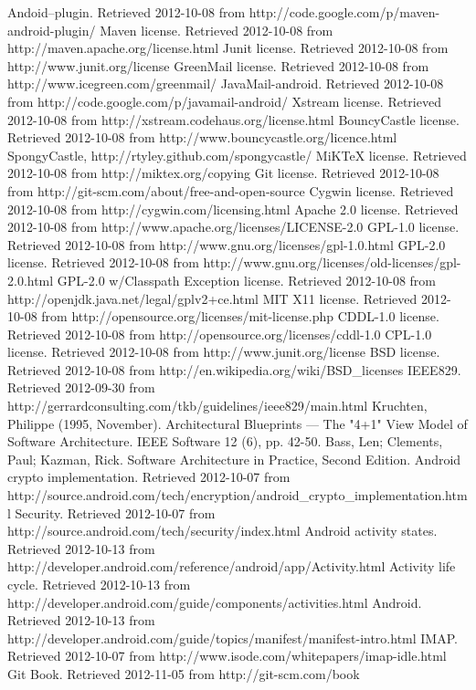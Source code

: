 \documentclass[12pt]{report}
\begin{document}
\begin{thebibliography}{99}
 Andoid--plugin. Retrieved 2012-10-08 from http://code.google.com/p/maven-android-plugin/
 Maven license. Retrieved 2012-10-08 from http://maven.apache.org/license.html
 Junit license. Retrieved 2012-10-08 from http://www.junit.org/license
 GreenMail license. Retrieved 2012-10-08 from http://www.icegreen.com/greenmail/
 JavaMail-android. Retrieved 2012-10-08 from http://code.google.com/p/javamail-android/
 Xstream license. Retrieved 2012-10-08 from http://xstream.codehaus.org/license.html
 BouncyCastle license. Retrieved 2012-10-08 from http://www.bouncycastle.org/licence.html
 SpongyCastle, http://rtyley.github.com/spongycastle/
 MiKTeX license. Retrieved 2012-10-08 from http://miktex.org/copying
 Git license. Retrieved 2012-10-08 from http://git-scm.com/about/free-and-open-source
 Cygwin license. Retrieved 2012-10-08 from http://cygwin.com/licensing.html
 Apache 2.0 license. Retrieved 2012-10-08 from http://www.apache.org/licenses/LICENSE-2.0
 GPL-1.0 license. Retrieved 2012-10-08 from http://www.gnu.org/licenses/gpl-1.0.html
 GPL-2.0 license. Retrieved 2012-10-08 from http://www.gnu.org/licenses/old-licenses/gpl-2.0.html
 GPL-2.0 w/Classpath Exception license. Retrieved 2012-10-08 from http://openjdk.java.net/legal/gplv2+ce.html
 MIT X11 license. Retrieved 2012-10-08 from http://opensource.org/licenses/mit-license.php
 CDDL-1.0 license. Retrieved 2012-10-08 from http://opensource.org/licenses/cddl-1.0
 CPL-1.0 license. Retrieved 2012-10-08 from http://www.junit.org/license
 BSD license. Retrieved 2012-10-08 from http://en.wikipedia.org/wiki/BSD\_licenses
 IEEE829. Retrieved  2012-09-30 from http://gerrardconsulting.com/tkb/guidelines/ieee829/main.html
 Kruchten, Philippe (1995, November). Architectural Blueprints — The "4+1" View Model of Software Architecture. IEEE Software 12 (6), pp. 42-50.
 Bass, Len; Clements, Paul; Kazman, Rick. Software Architecture in Practice, Second Edition.
 Android crypto implementation. Retrieved 2012-10-07 from http://source.android.com/tech/encryption/android\_crypto\_implementation.html
 Security. Retrieved 2012-10-07 from http://source.android.com/tech/security/index.html
 Android activity states. Retrieved 2012-10-13 from http://developer.android.com/reference/android/app/Activity.html
 Activity life cycle. Retrieved 2012-10-13 from http://developer.android.com/guide/components/activities.html
 Android. Retrieved 2012-10-13 from http://developer.android.com/guide/topics/manifest/manifest-intro.html
 IMAP. Retrieved 2012-10-07 from http://www.isode.com/whitepapers/imap-idle.html
 Git Book. Retrieved 2012-11-05 from http://git-scm.com/book


\end{thebibliography}
\end{document}
